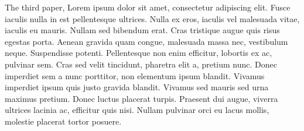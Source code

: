 The third paper, Lorem ipsum dolor sit amet, consectetur adipiscing elit. Fusce iaculis nulla in est pellentesque ultrices. Nulla ex eros, iaculis vel malesuada vitae, iaculis eu mauris. Nullam sed bibendum erat. Cras tristique augue quis risus egestas porta. Aenean gravida quam congue, malesuada massa nec, vestibulum neque. Suspendisse potenti. Pellentesque non enim efficitur, lobortis ex ac, pulvinar sem. Cras sed velit tincidunt, pharetra elit a, pretium nunc. Donec imperdiet sem a nunc porttitor, non elementum ipsum blandit. Vivamus imperdiet ipsum quis justo gravida blandit. Vivamus sed mauris sed urna maximus pretium. Donec luctus placerat turpis. Praesent dui augue, viverra ultrices lacinia ac, efficitur quis nisi. Nullam pulvinar orci eu lacus mollis, molestie placerat tortor posuere.
